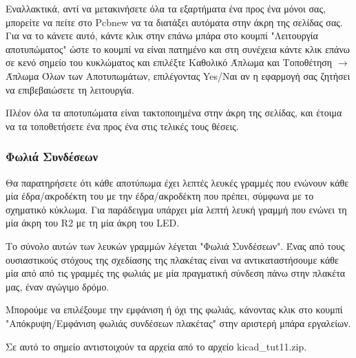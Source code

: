 \documentclass[a4paper]{article}
\begin{document}
Εναλλακτικά, αντί να μετακινήσετε όλα τα εξαρτήματα ένα προς ένα μόνοι σας, μπορείτε να πείτε στο \textenglish{Pcbnew} να τα διατάξει αυτόματα στην άκρη της σελίδας σας. Για να το κάνετε αυτό, κάντε κλικ στην επάνω μπάρα στο κουμπί "Λειτουργία αποτυπώματος" ώστε το κουμπί να είναι πατημένο και στη συνέχεια κάντε κλικ επάνω σε κενό σημείο του κυκλώματος και επιλέξτε Καθολικό Άπλωμα και Τοποθέτηση $\rightarrow$ Άπλωμα Όλων των Αποτυπωμάτων, επιλέγοντας Yes/Ναι αν η εφαρμογή σας ζητήσει να επιβεβαιώσετε τη λειτουργία. 

Πλέον όλα τα αποτυπώματα είναι τακτοποιημένα στην άκρη της σελίδας, και έτοιμα να τα τοποθετήσετε ένα προς ένα στις τελικές τους θέσεις.

\begin{figure}
  \begin{center}
    \label{fig:kicad-main}
  \end{center}
\end{figure}

\subsubsection{Φωλιά Συνδέσεων}
Θα παρατηρήσετε ότι κάθε αποτύπωμα έχει λεπτές λευκές γραμμές που ενώνουν κάθε μία έδρα/ακροδέκτη του με την έδρα/ακροδέκτη που πρέπει, σύμφωνα με το σχηματικό κύκλωμα. Για παράδειγμα υπάρχει μία λεπτή λευκή γραμμή που ενώνει τη μία άκρη του R2 με τη μία άκρη του \textenglish{LED}. 

Το σύνολο αυτών των λευκών γραμμών λέγεται "Φωλιά Συνδέσεων". Ένας από τους ουσιαστικούς στόχους της σχεδίασης της πλακέτας είναι να αντικαταστήσουμε κάθε μία από από τις γραμμές της φωλιάς με μία πραγματική σύνδεση πάνω στην πλακέτα μας, έναν αγώγιμο δρόμο. 

Μπορούμε να επιλέξουμε την εμφάνιση ή όχι της φωλιάς, κάνοντας κλικ στο κουμπί "Απόκρυψη/Εμφάνιση φωλιάς συνδέσεων πλακέτας" στην αριστερή μπάρα εργαλείων.

\begin{figure}
  \begin{center}
    \label{fig:kicad-main}
  \end{center}
\end{figure}

Σε αυτό το σημείο αντιστοιχούν τα αρχεία από το αρχείο kicad\_tut11.zip.
\end{document}
